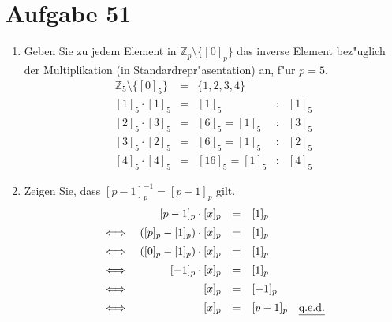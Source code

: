 \section{Aufgabe 51}

\begin{enumerate}
    \item Geben Sie zu jedem Element in $\mathbb{Z}_p \setminus \{[0]_p\}$ das
        inverse Element bez"uglich der Multiplikation (in
        Standardrepr"asentation) an, f"ur $p = 5$.
        \begin{equation*}
            \begin{array}{rclcl}
                \mathbb{Z}_5 \setminus \{[0]_5\} &=& \{1, 2, 3, 4\}&& \\[10pt]
                [1]_5 \cdot [1]_5 &=& [1]_5 &:& [1]_5 \\[5pt]
                [2]_5 \cdot [3]_5 &=& [6]_5 = [1]_5 &:& [3]_5 \\[5pt]
                [3]_5 \cdot [2]_5 &=& [6]_5 = [1]_5 &:& [2]_5 \\[5pt]
                [4]_5 \cdot [4]_5 &=& [16]_5 = [1]_5 &:& [4]_5
            \end{array}
        \end{equation*}
    \item Zeigen Sie, dass $[p - 1]^{-1}_p = [p - 1]_p$ gilt.
        \begin{equation*}
            \begin{array}{rrcl}
                    &[p - 1]_p \cdot [x]_p &=& [1]_p \\[5pt]
                \iff&([p]_p - [1]_p) \cdot [x]_p &=& [1]_p \\[5pt]
                \iff&([0]_p - [1]_p) \cdot [x]_p &=& [1]_p \\[5pt]
                \iff&[-1]_p \cdot [x]_p &=& [1]_p \\[5pt]
                \iff&[x]_p &=& [-1]_p \\[5pt]
                \iff&[x]_p &=& [p - 1]_p \quad \text{\underline{q.e.d.}}
             \end{array}
        \end{equation*}
\end{enumerate}
